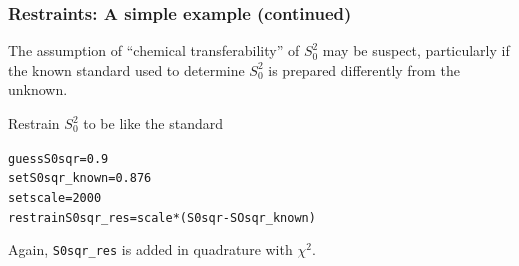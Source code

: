 \documentclass[10pt, xcolor=x11names, compress]{beamer}
\begin{document}
\begin{frame}[fragile]
  \frametitle{Restraints: A simple example (continued)}

  \small
  The assumption of ``chemical transferability'' of $S_0^2$ may be
  suspect, particularly if the known standard used to determine
  $S_0^2$ is prepared differently from the unknown.

  \bigskip

  Restrain $S_0^2$ to be like the standard
  \begin{block}{}
    \begin{alltt}
    \scriptsize
     {\color{guessp}guess}    S0sqr = 0.9
     {\color{setp}set}      S0sqr\_known = 0.876
     {\color{setp}set}      scale = 2000
     {\color{restrainp}restrain} S0sqr\_res = scale * (S0sqr - SOsqr\_known)
    \end{alltt}
  \end{block}

  \medskip

  Again, \texttt{S0sqr\_res} is added in quadrature with $\chi^2$.

  \medskip

\end{frame}
\end{document}
